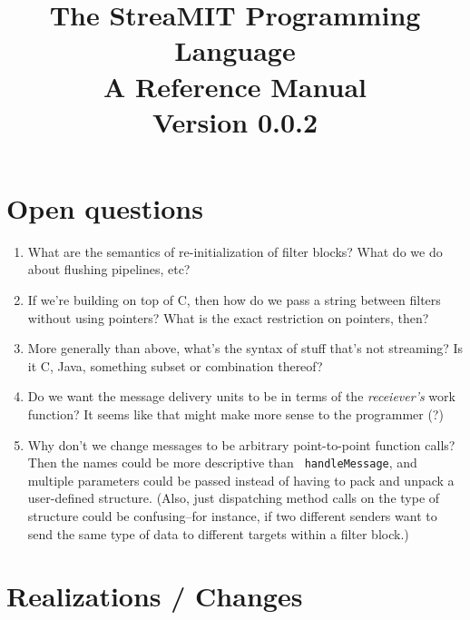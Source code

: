 \documentclass[draft]{article}
\title{The StreaMIT Programming Language \\ A Reference Manual \\ Version 0.0.2}
\begin{document}
\maketitle

\section{Open questions}

\begin{enumerate}

\item What are the semantics of re-initialization of filter blocks?
What do we do about flushing pipelines, etc?

\item If we're building on top of C, then how do we pass a string
between filters without using pointers?  What is the exact restriction
on pointers, then?

\item More generally than above, what's the syntax of stuff that's not
streaming?  Is it C, Java, something subset or combination thereof?

\item Do we want the message delivery units to be in terms of the {\it
receiever's} work function?  It seems like that might make more sense
to the programmer (?)

\item Why don't we change messages to be arbitrary point-to-point
function calls?  Then the names could be more descriptive than {\tt
handleMessage}, and multiple parameters could be passed instead of
having to pack and unpack a user-defined structure.  (Also, just
dispatching method calls on the type of structure could be
confusing--for instance, if two different senders want to send the
same type of data to different targets within a filter block.)

\end{enumerate}

\section{Realizations / Changes}
\end{document}
